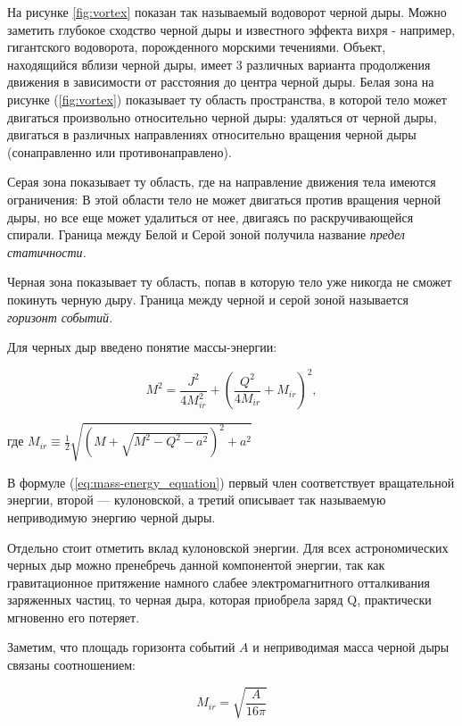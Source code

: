 \documentclass[a4paper,14pt]{article}
\begin{document}
На рисунке \ref{fig:vortex} показан так называемый водоворот черной дыры. Можно заметить глубокое сходство черной дыры и известного эффекта вихря - например, гигантского водоворота, порожденного морскими течениями. Объект, находящийся вблизи черной дыры, имеет 3 различных варианта продолжения движения в зависимости от расстояния до центра черной дыры. Белая зона на рисунке (\ref{fig:vortex}) показывает ту область пространства, в которой тело может двигаться произвольно относительно черной дыры: удаляться от черной дыры, двигаться в различных направлениях относительно вращения черной дыры (сонаправленно или противонаправлено).

Серая зона показывает ту область, где на направление движения тела имеются ограничения: В этой области тело не может двигаться против вращения черной дыры, но все еще может удалиться от нее, двигаясь по раскручивающейся спирали. Граница между Белой и Серой зоной получила название \textit{предел статичности.}

Черная зона показывает ту область, попав в которую тело уже никогда не сможет покинуть черную дыру. Граница между черной и серой зоной называется \textit{горизонт событий.}

Для черных дыр введено понятие массы-энергии:

\begin{equation}
M^{2} = \frac{J^{2}}{4M_{ir}^{2}} + \left(\frac{Q^{2}}{4M_{ir}} + M_{ir}\right)^{2},
\label{eq:mass-energy_equation}
\end{equation}

где $M_{ir} \equiv \frac{1}{2}\sqrt{\left(M + \sqrt{M^{2} - Q^{2} - a^{2}}\right)^{2} + a^{2}}$

В формуле (\ref{eq:mass-energy_equation}) первый член соответствует вращательной энергии, второй — кулоновской, а третий описывает так называемую неприводимую энергию черной дыры. 

Отдельно стоит отметить вклад кулоновской энергии. Для всех астрономических черных дыр можно пренебречь данной компонентой энергии, так как гравитационное притяжение намного слабее электромагнитного отталкивания заряженных частиц, то черная дыра, которая приобрела заряд Q, практически мгновенно его потеряет. 

Заметим, что площадь горизонта событий $A$ и неприводимая масса черной дыры связаны соотношением:

\begin{equation}
M_{ir} = \sqrt{\frac{A}{16\pi}}
\label{eq:mass_square_equation}
\end{equation}
\end{document}
